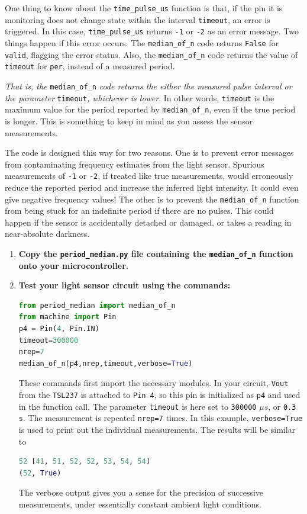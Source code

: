 {One thing to know about the \lstinline{time_pulse_us} function is that, if the pin it is monitoring does not change state within the interval \texttt{timeout}, an error is triggered.
In this case, \lstinline{time_pulse_us} returns \texttt{-1} or \texttt{-2} as an error message.
Two things happen if this error occurs.
The \lstinline{median_of_n} code returns \texttt{False} for \lstinline{valid}, flagging the error status.
Also, the  \lstinline{median_of_n} code returns the value of \texttt{timeout} for \lstinline{per}, instead of a measured period.

\emph{That is, the} \lstinline{median_of_n} \emph{code returns the either the measured pulse interval or the parameter} \lstinline{timeout}\emph{, whichever is lower}.
In other words, \texttt{timeout} is the maximum value for the period reported by \lstinline{median_of_n}, even if the true period is longer.
This is something to keep in mind as you assess the sensor measurements.

The code is designed this way for two reasons.
One is to prevent error messages from contaminating frequency estimates from the light sensor.
Spurious measurements of \texttt{-1} or \texttt{-2}, if treated like true measurements, would erroneously reduce the reported period and increase the inferred light intensity.
It could even give negative frequency values!
The other is to prevent the \lstinline{median_of_n} function from being stuck for an indefinite period if there are no pulses.
This could happen if the sensor is accidentally detached or damaged, or takes a reading in near-absolute darkness.


\begin{enumerate}[resume]
	\item \textbf{Copy the \lstinline{period_median.py} file containing the \lstinline{median_of_n} function onto your microcontroller.}
	\item \textbf{Test your light sensor circuit using the commands:}
\begin{lstlisting}[language=Python]
from period_median import median_of_n
from machine import Pin
p4 = Pin(4, Pin.IN)
timeout=300000
nrep=7
median_of_n(p4,nrep,timeout,verbose=True)
\end{lstlisting}
	These commands first import the necessary modules.
	In your circuit, \texttt{Vout} from the \texttt{TSL237} is attached to \texttt{Pin 4}, so this pin is initialized as \texttt{p4} and used in the function call.
	The parameter \texttt{timeout} is here set to \texttt{300000} $\mu s$, or \texttt{0.3 s}.
	The measurement is repeated \texttt{nrep=7} times.
	In this example, \texttt{verbose=True} is used to print out the individual measurements.
	The results will be similar to
\begin{lstlisting}[language=Python]
52 [41, 51, 52, 52, 53, 54, 54]
(52, True)
\end{lstlisting}
	The verbose output gives you a sense for the precision of successive measurements, under essentially constant ambient light conditions.


\end{enumerate}}
